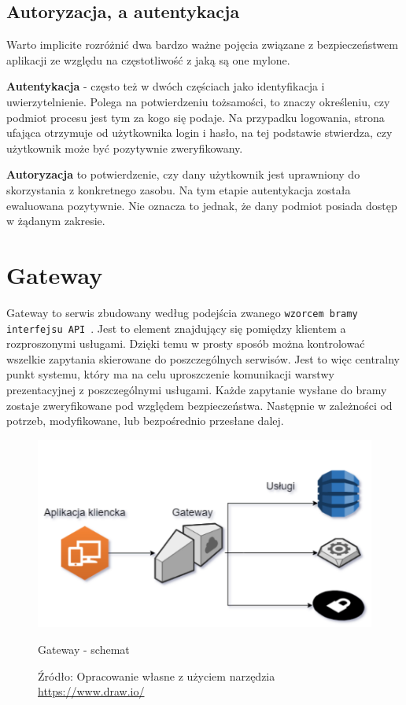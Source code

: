 \subsection{Autoryzacja, a autentykacja}

Warto implicite rozróżnić dwa bardzo ważne pojęcia związane z bezpieczeństwem aplikacji ze względu na częstotliwość z jaką są one mylone.

\textbf{Autentykacja} - często też w dwóch częściach jako identyfikacja i uwierzytelnienie. Polega na potwierdzeniu tożsamości, to znaczy określeniu, czy podmiot procesu jest tym za kogo się podaje. Na przypadku logowania, strona ufająca otrzymuje od użytkownika login i hasło, na tej podstawie stwierdza, czy użytkownik może być pozytywnie zweryfikowany.

\textbf{Autoryzacja} to potwierdzenie, czy dany użytkownik jest uprawniony do skorzystania z konkretnego zasobu. Na tym etapie autentykacja została ewaluowana pozytywnie. Nie oznacza to jednak, że dany podmiot posiada dostęp w żądanym zakresie. 

\section{Gateway}
Gateway to serwis zbudowany według podejścia zwanego \texttt{wzorcem bramy interfejsu API}~\cite{richardson2018api}. Jest to element znajdujący się pomiędzy klientem a rozproszonymi usługami. Dzięki temu w prosty sposób można kontrolować wszelkie zapytania skierowane do poszczególnych serwisów.
Jest to więc centralny punkt systemu, który ma na celu uproszczenie komunikacji warstwy prezentacyjnej z poszczególnymi usługami. Każde zapytanie wysłane do bramy zostaje zweryfikowane pod względem bezpieczeństwa. Następnie w zależności od potrzeb, modyfikowane, lub bezpośrednio przesłane dalej.
\begin{figure}[H]
	\centering
	\includegraphics[width=\linewidth]{gateway.pdf}
	\caption{Gateway - schemat}
	\caption*{Źródło: {Opracowanie własne z użyciem narzędzia \url{https://www.draw.io/}}}
\end{figure}

